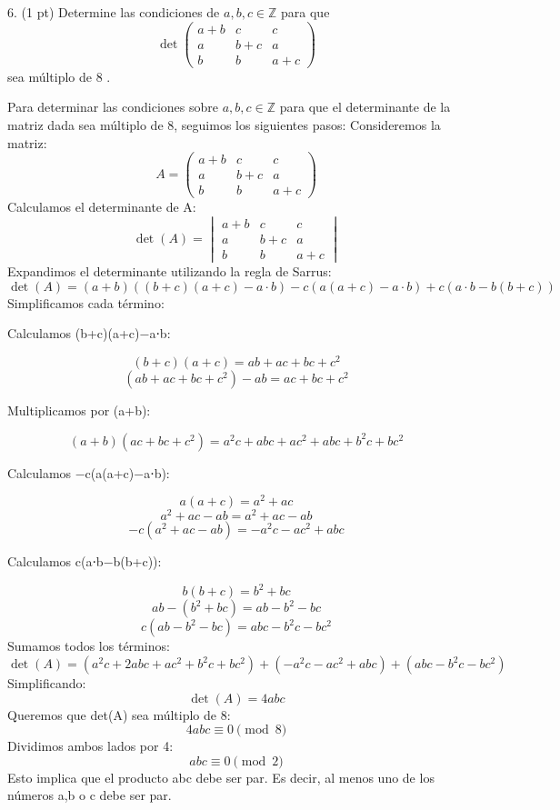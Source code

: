6. (1 pt) Determine las condiciones de \( a, b, c \in \mathbb{Z} \) para que
\[
\operatorname{det}\left(\begin{array}{ccc}
a+b & c & c \\
a & b+c & a \\
b & b & a+c
\end{array}\right)
\]
sea múltiplo de 8 . \\

\begin{solution}
Para determinar las condiciones sobre \( a, b, c \in \mathbb{Z} \) para que el determinante de la matriz dada sea múltiplo de 8, seguimos los siguientes pasos:
Consideremos la matriz:
\[
A = \begin{pmatrix}
a+b & c & c \\
a & b+c & a \\
b & b & a+c
\end{pmatrix}
\]
Calculamos el determinante de A:
\[
\det(A) = \begin{vmatrix}
a+b & c & c \\
a & b+c & a \\
b & b & a+c
\end{vmatrix}
\]
Expandimos el determinante utilizando la regla de Sarrus:
\[
\det(A) = (a+b)\left( (b+c)(a+c) - a \cdot b \right) - c\left( a(a+c) - a \cdot b \right) + c\left( a \cdot b - b(b+c) \right)
\]
Simplificamos cada término:

Calculamos (b+c)(a+c)−a⋅b:

\[
(b+c)(a+c) = ab + ac + bc + c^2
\]
\[
(ab + ac + bc + c^2) - ab = ac + bc + c^2
\]

Multiplicamos por (a+b):

\[
(a+b)(ac + bc + c^2) = a^2c + abc + ac^2 + abc + b^2c + bc^2
\]

Calculamos −c(a(a+c)−a⋅b):

\[
a(a+c) = a^2 + ac
\]
\[
a^2 + ac - ab = a^2 + ac - ab
\]
\[
-c(a^2 + ac - ab) = -a^2c - a c^2 + a b c
\]

Calculamos c(a⋅b−b(b+c)):

\[
b(b+c) = b^2 + bc
\]
\[
a b - (b^2 + bc) = a b - b^2 - bc
\]
\[
c(a b - b^2 - bc) = a b c - b^2 c - b c^2
\]
Sumamos todos los términos:
\[
\det(A) = (a^2c + 2abc + a c^2 + b^2c + b c^2) + (-a^2c - a c^2 + a b c) + (a b c - b^2 c - b c^2)
\]
Simplificando:
\[
\det(A) = 4 a b c
\]
Queremos que det(A) sea múltiplo de 8:
\[
4 a b c \equiv 0 \pmod{8}
\]
Dividimos ambos lados por 4:
\[
a b c \equiv 0 \pmod{2}
\]
Esto implica que el producto abc debe ser par. Es decir, al menos uno de los números a,b o c debe ser par.
\end{solution}